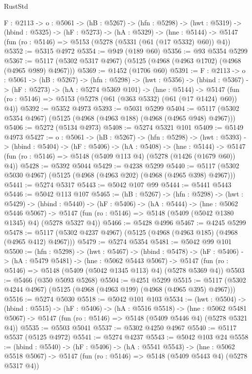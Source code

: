 \begin{lexlean}{RustStd}
\begin{coremodule}
  {F : @2113} ->
  {o : @5061} ->
  (hB : @5267) ->
  (hfn : @5298) ->
  (hwt : @5319) ->
  (hbind : @5325) ->
  (hF : @5273) ->
  (hA : @5329) ->
  (hne : @5144) -> @5147 (fun (ro : @5146) => @5153 (@5278 (@5331 (@61 (@17 @5332) @60)) @4))
@5352 := @5315 @4972
@5354 := @949 (@189 @60)
@5356 := @93 @5354 @5299
@5367 := @5117 (@5302 @5317 @4967) (@5125 (@4968 (@4963 @1702) (@4968 (@4965 @989) @4967)))
@5369 := @1452 (@1706 @60)
@5391 := {F : @2113} ->
  {o : @5061} ->
  (hB : @5267) ->
  (hfn : @5298) ->
  (hwt : @5356) ->
  (hbind : @5367) ->
  (hF : @5273) ->
  (hA : @5274 @5369 @101) ->
  (hne : @5144) ->
  @5147 (fun (ro : @5146) => @5153 (@5278 (@61 (@363 @5332) (@61 (@17 @1424) @60)) @4))
@5392 := @5352 @4973
@5393 := @5031 @5299
@5404 := @5117 (@5302 @5354 @4967) (@5125 (@4968 (@4963 @188) (@4968 (@4965 @948) @4967)))
@5406 := @5272 (@5134 @4973)
@5408 := @5274 @5321 @101
@5409 := @5149 @4973
@5427 := {o : @5061} ->
  (hB : @5267) ->
  (hfn : @5298) ->
  (hwt : @5393) ->
  (hbind : @5404) ->
  (hF : @5406) ->
  (hA : @5408) ->
  (hne : @5144) -> @5147 (fun (ro : @5146) => @5148 (@5409 @113 @4) (@5278 (@1426 (@1679 @60)) @4))
@5428 := @5392 @5044
@5429 := @4238 @5299
@5440 := @5117 (@5302 @5030 @4967) (@5125 (@4968 (@4963 @202) (@4968 (@4965 @398) @4967)))
@5441 := @5274 @5317
@5443 := @5042 @107 @99
@5444 := @5441 @5443
@5446 := @5042 @113 @107
@5465 := (hB : @5267) ->
  (hfn : @5298) ->
  (hwt : @5429) ->
  (hbind : @5440) ->
  (hF : @5406) ->
  (hA : @5444) ->
  (hne : @5062 @5446 @5067) ->
  @5147 (fun (ro : @5146) => @5148 (@5409 (@5042 @1380 @1345) @4) (@5278 @5327 @4))
@5466 := @5428 @4996
@5467 := @4245 @5299
@5478 := @5117 (@5302 @4237 @4967) (@5125 (@4968 (@4963 @185) (@4968 (@4965 @412) @4967)))
@5479 := @5274 @5354
@5481 := @5042 @99 @101
@5500 := (hfn : @5298) ->
  (hwt : @5467) ->
  (hbind : @5478) ->
  (hF : @5406) ->
  (hA : @5479 @5481) ->
  (hne : @5062 @5443 @5067) ->
  @5147 (fun (ro : @5146) => @5148 (@5409 (@5042 @1345 @113) @4) (@5278 @5369 @4))
@5503 := @5466 (@350 @5093 @5268)
@5504 := @4251 @5299
@5515 := @5117 (@5302 @4244 @4967) (@5125 (@4968 (@4963 @199) (@4968 (@4965 @395) @4967)))
@5516 := @5274 @5030
@5518 := @5042 @101 @103
@5534 := (hwt : @5504) ->
  (hbind : @5515) ->
  (hF : @5406) ->
  (hA : @5516 @5518) ->
  (hne : @5062 @5481 @5067) -> @5147 (fun (ro : @5146) => @5148 (@5409 @5446 @4) (@5278 @5321 @4))
@5535 := @5503 @5041
@5537 := @5302 @4250 @4967
@5540 := @5117 @5537 (@5125 @4972)
@5541 := @5274 @4237
@5543 := @5042 @103 @24
@5558 := (hbind : @5540) ->
  (hF : @5406) ->
  (hA : @5541 @5543) ->
  (hne : @5062 @5518 @5067) -> @5147 (fun (ro : @5146) => @5148 (@5409 @5443 @4) (@5278 @5317 @4))

\end{coremodule}
\end{lexlean}
